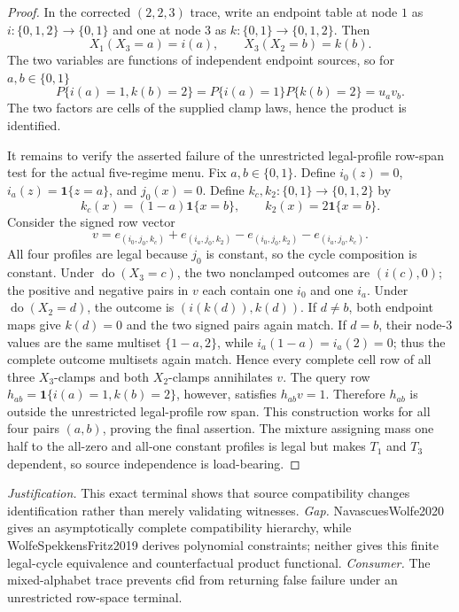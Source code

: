 \documentclass{article}
\begin{document}
\begin{proof}
In the corrected \((2,2,3)\) trace, write an endpoint table at node \(1\) as \(i:\{0,1,2\}\to\{0,1\}\) and one at node \(3\) as \(k:\{0,1\}\to\{0,1,2\}\).  Then
\[
 X_1(X_3=a)=i(a),\qquad X_3(X_2=b)=k(b).
\]
The two variables are functions of independent endpoint sources, so for \(a,b\in\{0,1\}\)
\[
 P\{i(a)=1,k(b)=2\}=P\{i(a)=1\}P\{k(b)=2\}=u_av_b.
\]
The two factors are cells of the supplied clamp laws, hence the product is identified.

It remains to verify the asserted failure of the unrestricted legal-profile row-span test for the actual five-regime menu.  Fix \(a,b\in\{0,1\}\).  Define \(i_0(z)=0\), \(i_a(z)=\mathbf 1\{z=a\}\), and \(j_0(x)=0\).  Define \(k_c,k_2:\{0,1\}\to\{0,1,2\}\) by
\[
 k_c(x)=(1-a)\mathbf 1\{x=b\},\qquad k_2(x)=2\mathbf 1\{x=b\}.
\]
Consider the signed row vector
\[
 v=e_{(i_0,j_0,k_c)}+e_{(i_a,j_0,k_2)}-e_{(i_0,j_0,k_2)}-e_{(i_a,j_0,k_c)}.
\]
All four profiles are legal because \(j_0\) is constant, so the cycle composition is constant.  Under \(\operatorname{do}(X_3=c)\), the two nonclamped outcomes are \((i(c),0)\); the positive and negative pairs in \(v\) each contain one \(i_0\) and one \(i_a\).  Under \(\operatorname{do}(X_2=d)\), the outcome is \((i(k(d)),k(d))\).  If \(d\ne b\), both endpoint maps give \(k(d)=0\) and the two signed pairs again match.  If \(d=b\), their node-\(3\) values are the same multiset \(\{1-a,2\}\), while \(i_a(1-a)=i_a(2)=0\); thus the complete outcome multisets again match.  Hence every complete cell row of all three \(X_3\)-clamps and both \(X_2\)-clamps annihilates \(v\).  The query row \(h_{ab}=\mathbf 1\{i(a)=1,k(b)=2\}\), however, satisfies \(h_{ab}v=1\).  Therefore \(h_{ab}\) is outside the unrestricted legal-profile row span.  This construction works for all four pairs \((a,b)\), proving the final assertion.  The mixture assigning mass one half to the all-zero and all-one constant profiles is legal but makes \(T_1\) and \(T_3\) dependent, so source independence is load-bearing.
\end{proof}
\par\smallskip\noindent \textit{Justification.} This exact terminal shows that source compatibility changes identification rather than merely validating witnesses. \textit{Gap.} NavascuesWolfe2020 gives an asymptotically complete compatibility hierarchy, while WolfeSpekkensFritz2019 derives polynomial constraints; neither gives this finite legal-cycle equivalence and counterfactual product functional. \textit{Consumer.} The mixed-alphabet trace prevents cfid from returning false failure under an unrestricted row-space terminal.
\end{document}
